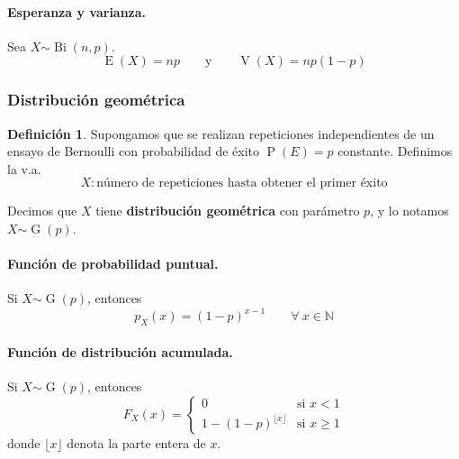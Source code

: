 \documentclass[11pt]{article}
\theoremstyle{plain}
\theoremstyle{definition}
\newtheorem*{defi}{Definición}
\theoremstyle{remark}
\newcommand{\deft}[1]{\textbf{#1}}  %
\newcommand{\proba}{\ensuremath{\operatorname{P}}}  %
\newcommand{\esp}[0]{\ensuremath{\operatorname{E}}}  %
\newcommand{\var}[0]{\ensuremath{\operatorname{V}}}  %
\newcommand{\foralle}{\ensuremath{\forall \ }}  %
\newcommand{\dist}[1]{\ensuremath{\sim \operatorname{#1}}}  %
\begin{document}
      \paragraph{Esperanza y varianza.}
      Sea $X \dist{Bi}(n,p)$.
      \[ \esp(X) = np \qquad \text{y} \qquad \var(X) = np(1 - p) \]

    \subsubsection{Distribución geométrica}

      \begin{defi}
        Supongamos que se realizan repeticiones independientes de un ensayo de Bernoulli con probabilidad de éxito $\proba(E) = p$ constante. Definimos la v.a.
        \[ X : \text{número de repeticiones hasta obtener el primer éxito} \]

        Decimos que $X$ tiene \deft{distribución geométrica} con parámetro $p$, y lo notamos $X \dist{G}(p)$.
      \end{defi}

      \paragraph{Función de probabilidad puntual.}
      Si $X \dist{G}(p)$, entonces
      \[ p_X(x) = (1 - p)^{x - 1} \qquad \foralle x \in \mathbb{N} \]

      \paragraph{Función de distribución acumulada.}
      Si $X \dist{G}(p)$, entonces
      \[ F_X(x) = \begin{cases}
        0 & \text{si $x < 1$} \\
        \displaystyle 1 - (1 - p)^{\lfloor x \rfloor} & \text{si $x \geq 1$}
      \end{cases}  \]
      donde $\lfloor x \rfloor$ denota la parte entera de $x$.
\end{document}
